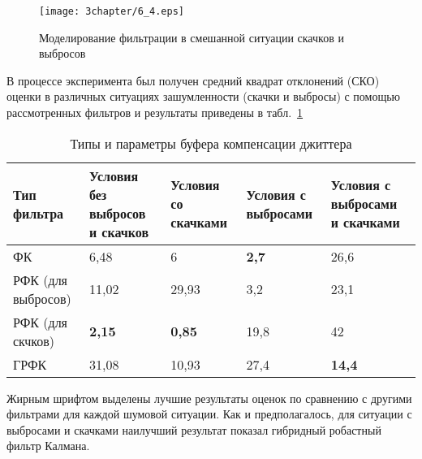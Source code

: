 \begin{figure} [h]
  \center
\texttt{[image: 3chapter/6\_4.eps]}
  \caption{Моделирование фильтрации в смешанной ситуации скачков и выбросов}
  \label{img3:filterMix}
\end{figure}

В процессе эксперимента был получен средний квадрат отклонений (СКО) оценки в различных ситуациях зашумленности (скачки и выбросы) с помощью рассмотренных фильтров и результаты приведены в табл. \ref{fkDiffSit}



\begin{table} [htbp]
  \centering
  \parbox{15cm}{\caption{Типы и параметры буфера компенсации джиттера}\label{fkDiffSit}}
\begin{tabular}{|p{3cm}|p{3cm}|p{3cm}|p{3cm}|p{3cm}|}
    \hline
    Тип фильтра        & Условия без выбросов и скачков & Условия со скачками & Условия с выбросами & Условия с выбросами и скачками \\ \hline
    ФК                 & 6,48                           & 6                   & \textbf{2,7}                 & 26,6                           \\ \hline
    РФК (для выбросов) & 11,02                          & 29,93               & 3,2                 & 23,1                           \\ \hline
    РФК (для скчков)   & \textbf{2,15}                           & \textbf{0,85}                & 19,8                & 42                             \\ \hline
    ГРФК               & 31,08                          & 10,93               & 27,4                & \textbf{14,4}                           \\ \hline
    \end{tabular}
\end{table}








Жирным шрифтом выделены лучшие результаты оценок по сравнению с другими фильтрами для каждой шумовой ситуации. Как и предполагалось, для ситуации с выбросами и скачками наилучший результат показал гибридный робастный фильтр Калмана.









\clearpage
